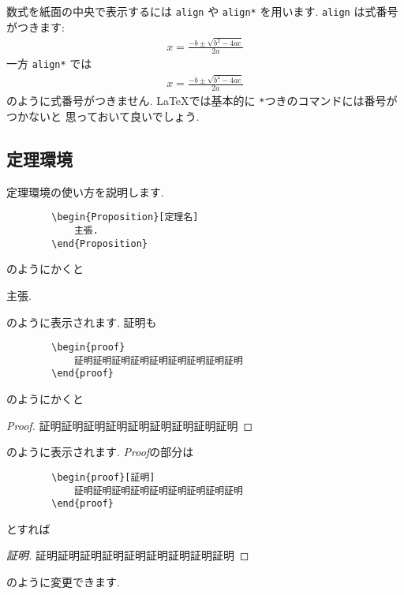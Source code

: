 数式を紙面の中央で表示するには
\verb|align|
や
\verb|align*|
を用います. 
\verb|align|
は式番号がつきます: 
\begin{align}
    x = \frac{-b \pm \sqrt{b^2 - 4ac}}{2a}
\end{align}
一方
\verb|align*|
では
\begin{align*}
    x = \frac{-b \pm \sqrt{b^2 - 4ac}}{2a}
\end{align*}
のように式番号がつきません. \LaTeX では基本的に
\verb|*|つきのコマンドには番号がつかないと
思っておいて良いでしょう. 

\subsection{定理環境}

定理環境の使い方を説明します. 
\begin{screen}
    \begin{verbatim}
        \begin{Proposition}[定理名]
            主張. 
        \end{Proposition}\end{verbatim}
\end{screen}
のようにかくと
\begin{Proposition}[定理名]
    主張. 
\end{Proposition}
のように表示されます. 証明も
\begin{screen}
    \begin{verbatim}
        \begin{proof}
            証明証明証明証明証明証明証明証明証明
        \end{proof}\end{verbatim}
\end{screen}
のようにかくと
\begin{proof}
    証明証明証明証明証明証明証明証明証明
\end{proof}
のように表示されます. \textit{Proof}の部分は
\begin{screen}
    \begin{verbatim}
        \begin{proof}[証明]
            証明証明証明証明証明証明証明証明証明
        \end{proof}\end{verbatim}
\end{screen}
とすれば
\begin{proof}[証明]
    証明証明証明証明証明証明証明証明証明
\end{proof}
のように変更できます. 

